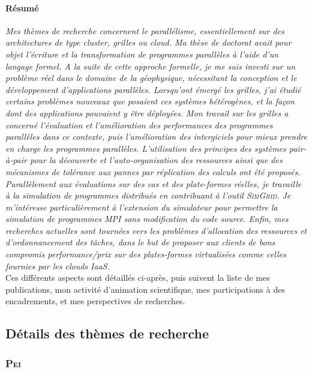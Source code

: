 \documentclass[11pt]{article}
\begin{document}
\paragraph{Résumé}
\textit{Mes thèmes de recherche concernent le \emph{parallélisme}, essentiellement 
sur des architectures de type cluster, \emph{grilles} ou \emph{cloud}. Ma thèse de 
doctorat avait pour objet l'écriture et la transformation de programmes parallèles 
à l'aide d'un langage formel. A la suite de cette approche formelle, je me suis 
investi sur un problème réel dans le domaine de la  géophysique, nécessitant la 
conception et le développement d'applications parallèles. Lorsqu'ont émergé les 
grilles, j'ai étudié certains problèmes nouveaux que posaient ces systèmes hétérogènes, 
et la façon dont des applications pouvaient y être déployées. Mon travail sur les 
grilles a concerné l'évaluation et l'amélioration des performances des programmes 
parallèles dans ce contexte, puis l'amélioration des intergiciels pour mieux prendre 
en charge les programmes parallèles. L'utilisation des principes des systèmes 
pair-à-pair pour la découverte et l'auto-organisation des ressources ainsi que 
des mécanismes de tolérance aux pannes par réplication des calculs ont été 
proposés.
Parallèlement aux évaluations sur des cas et des plate-formes réelles, je 
travaille à la simulation de programmes distribués en contribuant à l'outil 
\textsc{SimGrid}. Je m'intéresse particulièrement à l'extension du simulateur 
pour permettre la simulation de programmes MPI sans modification du code source.
Enfin, mes recherches actuelles sont tournées vers les problèmes d'allocation des
ressources et d'ordonnancement des tâches, dans le but de proposer aux clients
de bons compromis performance/prix sur des plates-formes virtualisées comme celles 
fournies par les clouds IaaS.}\\ 

Ces différents aspects sont détaillés ci-après, puis suivent la liste de mes publications, mon 
activité d'animation scientifique, mes participations à des encadrements, et mes perspectives de recherches.

\subsection{Détails des thèmes de recherche}


\subsubsection{\textsc{Pei}}
\end{document}

